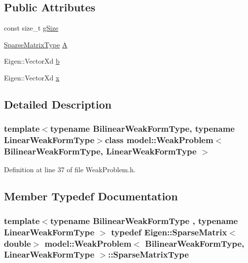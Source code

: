 \subsection*{Public Attributes}
\begin{DoxyCompactItemize}
\item 
const size\+\_\+t \hyperlink{classmodel_1_1_weak_problem_ac0eb7600ebecb8e0cf840c25382b82b3}{g\+Size}
\item 
\hyperlink{classmodel_1_1_weak_problem_ac6f9c93aad1dbfc9ed93364bce632dc6}{Sparse\+Matrix\+Type} \hyperlink{classmodel_1_1_weak_problem_a95f04f609e8e1c267c577ee22fbc816b}{A}
\item 
Eigen\+::\+Vector\+Xd \hyperlink{classmodel_1_1_weak_problem_ac2a1aaf942f5f779ec4a2869acf61e5c}{b}
\item 
Eigen\+::\+Vector\+Xd \hyperlink{classmodel_1_1_weak_problem_ada469fc18740b2590630205adc41d9ee}{x}
\end{DoxyCompactItemize}


\subsection{Detailed Description}
\subsubsection*{template$<$typename Bilinear\+Weak\+Form\+Type, typename Linear\+Weak\+Form\+Type$>$class model\+::\+Weak\+Problem$<$ Bilinear\+Weak\+Form\+Type, Linear\+Weak\+Form\+Type $>$}



Definition at line 37 of file Weak\+Problem.\+h.



\subsection{Member Typedef Documentation}
\hypertarget{classmodel_1_1_weak_problem_ac6f9c93aad1dbfc9ed93364bce632dc6}{}
\subsubsection[{Sparse\+Matrix\+Type}]{\setlength{\rightskip}{0pt plus 5cm}template$<$typename Bilinear\+Weak\+Form\+Type , typename Linear\+Weak\+Form\+Type $>$ typedef Eigen\+::\+Sparse\+Matrix$<$double$>$ {\bf model\+::\+Weak\+Problem}$<$ Bilinear\+Weak\+Form\+Type, Linear\+Weak\+Form\+Type $>$\+::{\bf Sparse\+Matrix\+Type}}\label{classmodel_1_1_weak_problem_ac6f9c93aad1dbfc9ed93364bce632dc6}



